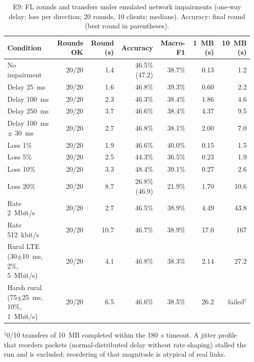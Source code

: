 \begin{table}[t]
\centering
\caption{E9: FL rounds and transfers under emulated network impairments (one-way delay; loss per direction; 20 rounds, 10 clients; medians). Accuracy: final round (best round in parentheses).}
\label{tab:e9}
\footnotesize
\begin{tabular}{l r r r r r r}
\toprule
\textbf{Condition} & \textbf{Rounds OK} & \textbf{Round (s)} & \textbf{Accuracy} & \textbf{Macro-F1} & \textbf{1~MB (s)} & \textbf{10~MB (s)} \\
\midrule
No impairment                          & 20/20 & 1.4  & 46.5\% (47.2) & 38.7\% & 0.13 & 1.2 \\
Delay 25~ms                            & 20/20 & 1.6  & 46.8\% & 39.3\% & 0.60 & 2.2 \\
Delay 100~ms                           & 20/20 & 2.3  & 46.3\% & 38.4\% & 1.86 & 4.6 \\
Delay 250~ms                           & 20/20 & 3.7  & 46.6\% & 38.4\% & 4.37 & 9.5 \\
Delay 100~ms $\pm$ 30~ms               & 20/20 & 2.7  & 46.8\% & 38.1\% & 2.00 & 7.0 \\
Loss 1\%                               & 20/20 & 1.9  & 46.6\% & 40.0\% & 0.15 & 1.5 \\
Loss 5\%                               & 20/20 & 2.5  & 44.3\% & 36.5\% & 0.23 & 1.9 \\
Loss 10\%                              & 20/20 & 3.3  & 48.4\% & 39.1\% & 0.27 & 2.6 \\
Loss 20\%                              & 20/20 & 8.7  & 26.8\% (46.9) & 21.9\% & 1.70 & 10.6 \\
Rate 2~Mbit/s                          & 20/20 & 2.7  & 46.5\% & 38.9\% & 4.49 & 43.8 \\
Rate 512~kbit/s                        & 20/20 & 10.7 & 46.7\% & 38.9\% & 17.0 & 167 \\
Rural LTE (30$\pm$10~ms, 2\%, 5~Mbit/s) & 20/20 & 4.1 & 46.8\% & 38.3\% & 2.14 & 27.2 \\
Harsh rural (75$\pm$25~ms, 10\%, 1~Mbit/s) & 20/20 & 6.5 & 46.6\% & 38.5\% & 26.2 & failed$^{\dagger}$ \\
\bottomrule
\end{tabular}
\vspace{0.3em}

{\scriptsize $^{\dagger}$0/10 transfers of 10~MB completed within the 180~s timeout. A jitter profile that reorders packets (normal-distributed delay without rate shaping) stalled the run and is excluded; reordering of that magnitude is atypical of real links.}
\end{table}

